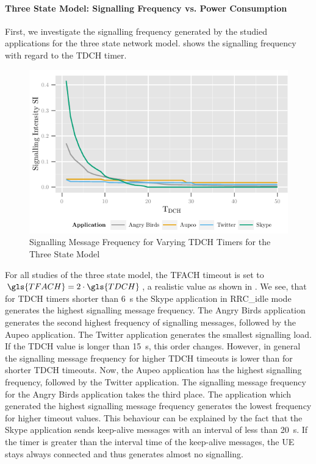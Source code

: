 \paragraph*{Three State Model: Signalling Frequency vs. Power Consumption}\label{sec:network:network_traces:numerical_results:three_states}
First, we investigate the signalling frequency generated by the studied applications for the three state network model. 
 shows the signalling frequency with regard to the \gls{TDCH} timer.
\begin{figure}
	\centering
	\includegraphics{network/network_traces/numerical_results/figures/3_state_tdch_vs_frequency}
	\caption{Signalling Message Frequency for Varying \gls{TDCH} Timers for the Three State Model}\label{fig:network:network_traces:numerical_results:three_states:three_states:signalling}
\end{figure}
For all studies of the three state model, the \gls{TFACH} timeout is set to \(\gls{TFACH} = 2\cdot  \gls{TDCH}\), a realistic value as shown in \cite{Qian2011}.
We see, that for \gls{TDCH} timers shorter than \SI{6}{\second} the Skype application in \gls{RRC_idle} mode generates the highest signalling message frequency.
The Angry Birds application generates the second highest frequency of signalling messages, followed by the Aupeo application.
The Twitter application generates the smallest signalling load.
If the \gls{TDCH} value is longer than \SI{15}{\second}, this order changes.
However, in general the signalling message frequency for higher \gls{TDCH} timeouts is lower than for shorter \gls{TDCH} timeouts.
Now, the Aupeo application has the highest signalling frequency, followed by the Twitter application.
The signalling message frequency for the Angry Birds application takes the third place.
The application which generated the highest signalling message frequency generates the lowest frequency for higher timeout values.
This behaviour can be explained by the fact that the Skype application sends keep-alive messages with an interval of less than \SI{20}{\second}.
If the timer is greater than the interval time of the keep-alive messages, the \gls{UE} stays always connected and thus generates almost no signalling.


